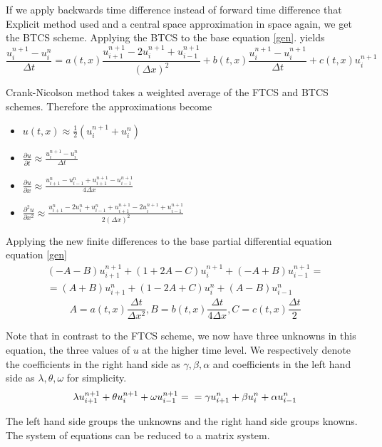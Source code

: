 \documentclass[12pt, oneside]{book}
\theoremstyle{plain}
\theoremstyle{definition}
\begin{document}
 If we apply backwards time difference instead of forward time difference that Explicit method used and a central space approximation in space again, we get the BTCS scheme. Applying the BTCS to the base equation \ref{gen}. yields
    \begin{equation}
\frac{u^{n+1}_i - u^n_i}{\Delta t}  = a(t, x)  \frac{u^{n+1}_{i+1}- 2u^{n+1}_i + u^{n+1}_{i-1}}{(\Delta x)^2}  + b(t, x)  \frac{u^{n+1}_i - u^{n+1}_i}{\Delta t}  + c(t, x)  u^{n+1}_i
\end{equation}

Crank-Nicolson method takes a weighted average of the FTCS and BTCS schemes. Therefore the approximations become
\begin{itemize}
 \item $ u(t,x) \approx \frac{1}{2} ( u^{n+1}_i +  u^n_i) $
 \item $   \frac{\partial u}{\partial t} \approx \frac{u^{n+1}_i - u^n_i}{\Delta t} $
 \item $   \frac{\partial u}{\partial x} \approx \frac{u^n_{i+1} - u^n_{i-1} + u^{n+1}_{i+1} - u^{n+1}_{i-1}}{4\Delta x} $
 \item $ \frac{\partial^2 u}{\partial x^2} \approx \frac{u^n_{i+1}- 2u^n_i + u^n_{i-1} + u^{n+1}_{i+1}- 2u^{n+1}_i + u^{n+1}_{i-1}}{2(\Delta x)^2} $
\end{itemize}

Applying the new finite differences to the base partial differential equation equation \ref{gen}
\begin{multline}
 (-A -B) u^{n+1}_{i+1} + (1 + 2A - C) u^{n+1}_i + (-A + B) u^{n+1}_{i-1} =  \\
=  (A+B) u^{n}_{i+1} + (1 - 2A + C) u^{n}_i + (A - B) u^{n}_{i-1}
\end{multline}
$$ A = a(t,x) \frac{\Delta t}{\Delta x^2},  B = b(t,x) \frac{\Delta t}{4\Delta x}, C = c(t,x) \frac{\Delta t}{2}$$ 

Note that in contrast to the FTCS scheme, we now have three unknowns in this equation, the three values of $u$ at the higher time level.  We respectively denote the coefficients in the right hand side as $\gamma, \beta, \alpha$ and coefficients in the left hand side as $\lambda, \theta, \omega$ for simplicity.
\begin{equation}
\lambda u^{n+1}_{i+1} + \theta u^{n+1}_i + \omega u^{n+1}_{i-1} =  \\
=  \gamma u^{n}_{i+1} + \beta u^{n}_i + \alpha u^{n}_{i-1}
\end{equation}

The left hand side groups the unknowns and the right hand side groups knowns. The system of equations can be  reduced to a matrix system. 
\end{document}
